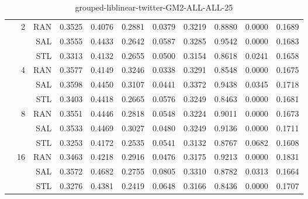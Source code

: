 \begin{center}
\begin{table}[htbp]
\begin{tabular}{ | r | r | r | r | r | r | r | r | r | r | r |}
 & \multirow{3}{*}{2} & RAN & 0.3525 & 0.4076 & 0.2881 & 0.0379 & 0.3219 & 0.8880 & 0.0000 & 0.1689\\ \cline{3-11}
 &   & SAL & 0.3555 & 0.4433 & 0.2642 & 0.0587 & 0.3285 & 0.9542 & 0.0000 & 0.1683\\ \cline{3-11}
 &   & STL & 0.3313 & 0.4132 & 0.2655 & 0.0500 & 0.3154 & 0.8618 & 0.0241 & 0.1658\\ \cline{2-11}
 & \multirow{3}{*}{4} & RAN & 0.3577 & 0.4149 & 0.3246 & 0.0338 & 0.3291 & 0.8548 & 0.0000 & 0.1675\\ \cline{3-11}
 &   & SAL & 0.3598 & 0.4450 & 0.3107 & 0.0441 & 0.3372 & 0.9438 & 0.0345 & 0.1718\\ \cline{3-11}
 &   & STL & 0.3403 & 0.4418 & 0.2665 & 0.0576 & 0.3249 & 0.8463 & 0.0000 & 0.1681\\ \cline{2-11}
 & \multirow{3}{*}{8} & RAN & 0.3551 & 0.4446 & 0.2818 & 0.0548 & 0.3224 & 0.9011 & 0.0000 & 0.1673\\ \cline{3-11}
 &   & SAL & 0.3533 & 0.4469 & 0.3027 & 0.0480 & 0.3249 & 0.9136 & 0.0000 & 0.1711\\ \cline{3-11}
 &   & STL & 0.3253 & 0.4172 & 0.2535 & 0.0541 & 0.3132 & 0.8767 & 0.0682 & 0.1608\\ \cline{2-11}
 & \multirow{3}{*}{16} & RAN & 0.3463 & 0.4218 & 0.2916 & 0.0476 & 0.3175 & 0.9213 & 0.0000 & 0.1831\\ \cline{3-11}
 &   & SAL & 0.3572 & 0.4682 & 0.2755 & 0.0805 & 0.3310 & 0.8782 & 0.0313 & 0.1664\\ \cline{3-11}
 &   & STL & 0.3276 & 0.4381 & 0.2419 & 0.0648 & 0.3166 & 0.8436 & 0.0000 & 0.1707\\ \cline{2-11}
\hline
\end{tabular}
\caption{grouped-liblinear-twitter-GM2-ALL-ALL-25}
\end{table}
\end{center}

